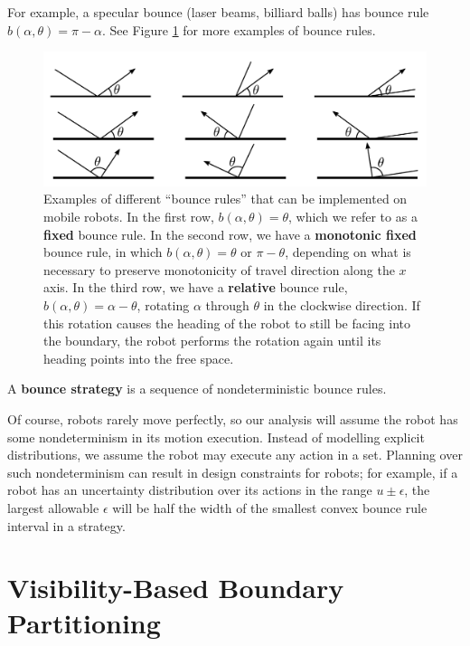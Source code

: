 \documentclass[]{styles/svproc}  %
\begin{document}
For example, a specular bounce (laser beams, billiard balls) has bounce rule 
$b(\alpha, \theta) = \pi - \alpha$. See Figure \ref{fig:bex} for more
examples of bounce rules. 

\begin{figure}
    \includegraphics[width=0.8\linewidth]{figures/bounce_examples.pdf}
    \centering
    \caption[test]{\label{fig:bex}Examples of different ``bounce rules'' that can be implemented on
mobile robots. In the first row, $b(\alpha, \theta) = \theta$, which we refer to
as a \textbf{fixed} bounce rule. In the second row, we have a \textbf{monotonic
fixed} bounce rule, in which
$b(\alpha, \theta) = \theta$ or $\pi-\theta$, depending on what is necessary to
preserve monotonicity of travel direction along the $x$ axis. In the third
row, we have a \textbf{relative} bounce rule, $b(\alpha, \theta) = \alpha - \theta$, rotating $\alpha$ through $\theta$ in the clockwise
direction. If this rotation causes the 
heading of the robot to still be facing into the boundary, the robot 
performs the rotation again until its heading points into the free space.
}
\end{figure}

\begin{definition}
A \textbf{bounce strategy} is a sequence of nondeterministic bounce rules.
\end{definition}

Of course, robots rarely move perfectly, so our analysis will assume the
robot has some nondeterminism in its motion execution.
Instead of modelling explicit
distributions, we assume the robot may execute any action in a set. 
Planning over such nondeterminism can result in design constraints
for robots; for example, if a robot has an uncertainty distribution over its 
actions in the range $u \pm \epsilon$, the largest allowable $\epsilon$ will 
be half the width of the smallest convex bounce rule interval in a strategy.

\section{Visibility-Based Boundary Partitioning} \label{sec:partition}
\end{document}
